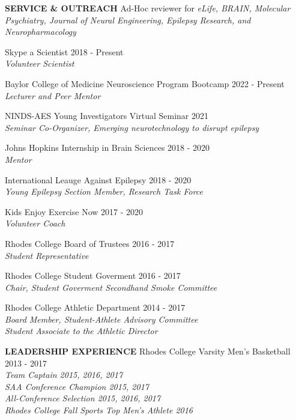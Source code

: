 \documentclass{resume} %
\begin{document}
\begin{rSection}{{\bfseries SERVICE \& OUTREACH}}
Ad-Hoc reviewer for \emph{eLife, BRAIN, Molecular Psychiatry, Journal of Neural Engineering, Epilepsy Research, and Neuropharmacology}
\item Skype a Scientist  \hfill {2018 - Present}
\\ \emph{Volunteer Scientist}
\item Baylor College of Medicine Neuroscience Program Bootcamp \hfill {2022 - Present}
\\ \emph{Lecturer and Peer Mentor}
\item NINDS-AES Young Investigators Virtual Seminar \hfill {2021} 
\\ \emph{Seminar Co-Organizer, Emerging neurotechnology to disrupt epilepsy}
\item Johns Hopkins Internship in Brain Sciences \hfill{2018 - 2020}
\\ \emph{Mentor}
\item International Leauge Against Epilepsy \hfill {2018 - 2020}
\\ \emph{Young Epilepsy Section Member, Research Task Force}
\item Kids Enjoy Exercise Now  \hfill {2017 - 2020}
\\ \emph{Volunteer Coach}
\item Rhodes College Board of Trustees \hfill {2016 - 2017}
\\ \emph{Student Representative}
\item Rhodes College Student Goverment \hfill {2016 - 2017}
\\ \emph{Chair, Student Goverment Secondhand Smoke Committee}
\item Rhodes College Athletic Department \hfill {2014 - 2017}
\\ \emph{Board Member, Student-Athlete Advisory Committee}
\\ \emph{Student Associate to the Athletic Director}
\end{rSection}


\begin{rSection}{{\bfseries LEADERSHIP EXPERIENCE}}
Rhodes College Varsity Men’s Basketball  \hfill {2013 - 2017}
\\ \emph{Team Captain 2015, 2016, 2017}
\\ \emph{SAA Conference Champion 2015, 2017}
\\ \emph{All-Conference Selection 2015, 2016, 2017}
\\ \emph{Rhodes College Fall Sports Top Men’s Athlete 2016}

\end{rSection}
\end{document}

